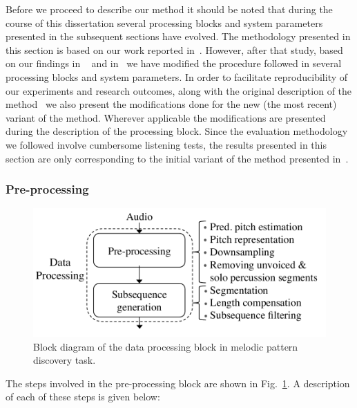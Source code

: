 Before we proceed to describe our method it should be noted that during the course of this dissertation several processing blocks and system parameters presented in the subsequent sections have evolved. The methodology presented in this section is based on our work reported in~\cite{gulati_SITIS_2014}. However, after that study, based on our findings in ~\cite{gulati_ICASSP2015} and in~\cite{gulati_ICASSP2015} we have modified the procedure followed in several processing blocks and system parameters. In order to facilitate reproducibility of our experiments and research outcomes, along with the original description of the method~\citep{gulati_SITIS_2014} we also present the modifications done for the new (the most recent) variant of the method. Wherever applicable the modifications are presented during the description of the processing block. Since the evaluation methodology we followed involve cumbersome listening tests, the results presented in this section are only corresponding to the initial variant of the method presented in~\cite{gulati_SITIS_2014}.


\subsubsection{Pre-processing}
\label{sec:pattern_discover_preprocessing}

\begin{figure}
	\begin{center}
		\includegraphics[width=\figSizeEightyFive]{ch06_patterns/figures/discovery/blockDiagram_DataProc.pdf}
	\end{center}
	\caption[Block diagram of data processing modules for melodic pattern discovery]{Block diagram of the data processing block in melodic pattern discovery task.}
	\label{fig:pattern_discovery_preprocessing_block_diagram}
\end{figure}


The steps involved in the pre-processing block are shown in Fig.~\ref{fig:pattern_discovery_preprocessing_block_diagram}. A description of each of these steps is given below:

